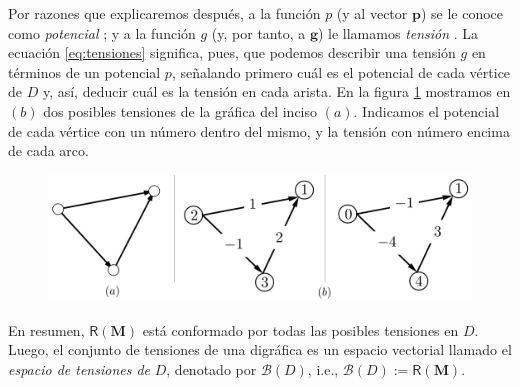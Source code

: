 Por razones que explicaremos después, a la función $p$ (y  al vector $\mathbf{p}$) se le conoce como \textit{potencial} ; y a la función $g$ (y, por tanto, a $\mathbf{g}$) le llamamos \textit{tensión} . La ecuación \ref{eq:tensiones} significa, pues, que podemos describir una tensión $g$ en términos de un potencial $p$, señalando primero cuál es el potencial de cada vértice de $D$ y, así, deducir cuál es la tensión en cada arista. En la figura \ref{fig:tensiones} mostramos en $(b)$ dos posibles tensiones de la gráfica del inciso $(a)$. Indicamos el potencial de cada vértice con un número dentro del mismo, y la tensión con número encima de cada arco. 

\begin{figure}[H]
    \centering
    \includegraphics[scale=0.2]{img/imgchapter2/tensiones.jpg}
    \caption{}
    \label{fig:tensiones}
\end{figure}

En resumen, $\mathsf{R}(\mathbf{M})$ está conformado por todas las posibles tensiones en $D$. Luego, el conjunto de tensiones de una digráfica es un espacio vectorial llamado el \textit{espacio de tensiones de} $D$, denotado por $\mathcal{B}(D)$, i.e., $\mathcal{B}(D):=\mathsf{R}(\mathbf{M})$. 

